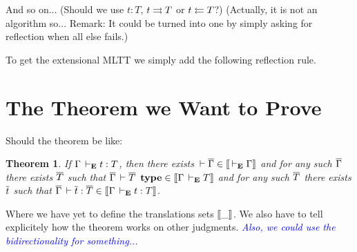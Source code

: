 \documentclass{amsart}
\newcommand\meta[1]{\noindent\textcolor{blue}{\emph{#1}}}
\newtheorem{theorem}{Theorem}[section]
\begin{document}
\begin{mathc}
\end{mathc}

\begin{mathc}
\end{mathc}
%
And so on... (Should we use $t : T$, $t \rightrightarrows T$ or $t \leftleftarrows T$?)
(Actually, it is not an algorithm so... Remark: It could be turned into one
by simply asking for reflection when all else fails.)

To get the extensional MLTT we simply add the following reflection rule.
%
\begin{mathc}
\end{mathc}


\section{The Theorem we Want to Prove}

Should the theorem be like:

\begin{theorem}
  If $\Gamma \,\vdash_\mathbf{E} t : T$, then there exists
  $\,\vdash \overline{\Gamma} \in \mathopen{{[\kern-0.14em[}} \,\vdash_\mathbf{E} \Gamma \mathclose{{]\kern-0.14em]}}$ and for any such $\overline{\Gamma}$ there exists
  $\overline{T}$ such that $\overline{\Gamma} \,\vdash \overline{T}\ \operatorname{\mathbf{type}} \in \mathopen{{[\kern-0.14em[}} \Gamma \,\vdash_\mathbf{E} T \mathclose{{]\kern-0.14em]}}$
  and for any such $\overline{T}$ there exists $\overline{t}$ such that
  $\overline{\Gamma} \,\vdash \overline{t} : \overline{T} \in \mathopen{{[\kern-0.14em[}} \Gamma \,\vdash_\mathbf{E} t : T \mathclose{{]\kern-0.14em]}}$.
\end{theorem}
%
Where we have yet to define the translations sets $\mathopen{{[\kern-0.14em[}} \_ \mathclose{{]\kern-0.14em]}}$.
We also have to tell explicitely how the theorem works on other judgments.
\meta{Also, we could use the bidirectionality for something...}
\end{document}
